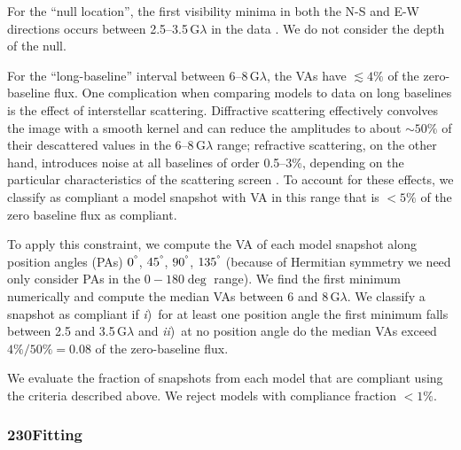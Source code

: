 For the ``null location'', the first visibility minima in both the N-S
and E-W directions occurs between 2.5--3.5\,$\mathrm{G}\lambda$ in the
data .
We do not consider the depth of the null.

For the ``long-baseline'' interval between 6--8\,$\mathrm{G}\lambda$,
the VAs have $\lesssim 4\%$ of the zero-baseline flux.
One complication when comparing models to data on long baselines is
the effect of interstellar scattering.
Diffractive scattering effectively convolves the image with a smooth
kernel and can reduce the amplitudes to about $\sim 50\%$ of their
descattered values in the 6--8\,$\mathrm{G}\lambda$ range; refractive
scattering, on the other hand, introduces noise at all baselines of
order 0.5--3\%, depending on the particular characteristics of the
scattering screen \citep{2018arXiv180501242P, 2018ApJ...865..104J}.
To account for these effects, we classify as compliant a model snapshot with
VA
in this range that is $< 5\%$ of the zero baseline flux as compliant.

To apply this constraint, we compute the VA of each model snapshot
along position angles (PAs) $0^\degree$, $45^\degree$, $90^\degree$,
$135^\degree$ (because of Hermitian symmetry we need only consider PAs in the $0-180\deg$ range).
We find the first minimum numerically and compute the median VAs
between 6 and 8\,$\mathrm{G}\lambda$.
We classify a snapshot as compliant if
\emph{i})~for at least one position angle the first minimum falls
between 2.5 and 3.5\,$\mathrm{G}\lambda$ and
\emph{ii})~at no position angle do the median VAs exceed
$4\% / 50\% = 0.08$
of the zero-baseline flux.

We evaluate the fraction of snapshots from each model that are
compliant using the criteria described above.
We reject models with compliance fraction $< 1\%$.

\subsubsection{230\GHz \Mring Fitting}

